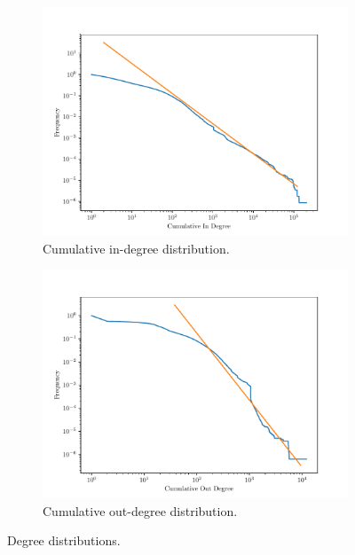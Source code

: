 \documentclass[9pt,a4paper]{article}
\begin{document}
\begin{figure}[h]
	\centering
	\begin{subfigure}{.5\textwidth}
		\centering
		\includegraphics[width=\linewidth]{wikipedia_pt_in.pdf}
		\caption{Cumulative in-degree distribution.}
		\label{fig:inddist}
	\end{subfigure}%
	\begin{subfigure}{.5\textwidth}
		\centering
		\includegraphics[width=\linewidth]{wikipedia_pt_out.pdf}
		\caption{Cumulative out-degree distribution.}
		\label{fig:outddist}
	\end{subfigure}
	\caption{Degree distributions.}
\end{figure}
\end{document}
